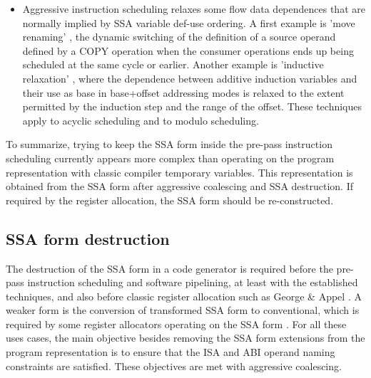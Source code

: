 \begin{itemize}
\item Aggressive instruction scheduling relaxes some flow data dependences that
are normally implied by SSA variable def-use ordering. A first example is 'move
renaming' \cite{Young:1998:MICRO}, the dynamic switching of the definition of a
source operand defined by a COPY operation when the consumer operations ends
up being scheduled at the same cycle or earlier. Another example is 'inductive
relaxation' \cite{Dinechin:1997:PaCT}, where the dependence between additive
induction variables and their use as base in base+offset addressing modes is
relaxed to the extent permitted by the induction step and the range of the
offset. These techniques apply to acyclic scheduling and to modulo scheduling.

\end{itemize}

To summarize, trying to keep the SSA form inside the pre-pass instruction scheduling
currently appears more complex than operating on the program representation with
classic compiler temporary variables. This representation is obtained from the
SSA form after aggressive coalescing and SSA destruction. If required by the
register allocation, the SSA form should be re-constructed.


\subsection{SSA form destruction}

The destruction of the SSA form in a code generator is required before the
pre-pass instruction scheduling and software pipelining, at least with the
established techniques, and also before classic register allocation such as
George \& Appel \cite{George96}. A weaker form is the conversion of transformed
SSA form to conventional, which is required by some register allocators
operating on the SSA form \cite{Pereira08}. For all these uses cases, the main
objective besides removing the SSA form extensions from the program
representation is to ensure that the ISA and ABI operand naming constraints are
satisfied. These objectives are met with aggressive coalescing.


